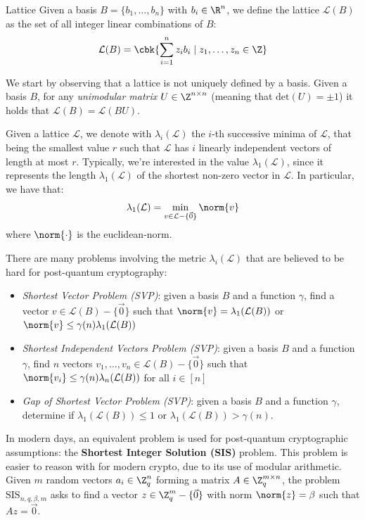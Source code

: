 \documentclass[a4paper, 12pt]{report}
\begin{document}
    \begin{frameddefn}{Lattice}
        Given a basis $B = \{b_1, \ldots, b_n\}$ with $b_i \in \R^n$, we define the lattice $\mathcal{L}(B)$ as the set of all integer linear combinations of $B$:
        \[\mathcal{L}(B) = \cbk{\sum_{i = 1}^{n} z_i b_i \mid z_1, \ldots, z_n \in \Z}\]
    \end{frameddefn}

    We start by observing that a lattice is not uniquely defined by a basis. Given a basis $B$, for any \textit{unimodular matrix} $U \in \Z^{n \times n}$ (meaning that $\mathrm{det}(U) = \pm 1$) it holds that $\mathcal{L}(B) = \mathcal{L}(BU)$.
    
    Given a lattice $\mathcal{L}$, we denote with $\lambda_i(\mathcal{L})$ the $i$-th successive minima of $\mathcal{L}$, that being the smallest value $r$ such that $\mathcal{L}$ has $i$ linearly independent vectors of length at most $r$. Typically, we're interested in the value $\lambda_1(\mathcal{L})$,  since it represents the length $\lambda_1(\mathcal{L})$ of the shortest non-zero vector in $\mathcal{L}$. In particular, we have that:
    \[\lambda_1(\mathcal{L}) = \min_{v \in \mathcal{L} - \{\vec 0\}} \norm{v}\]
    where $\norm{\cdot}$ is the euclidean-norm.

    There are many problems involving the metric $\lambda_i(\mathcal{L})$ that are believed to be hard for post-quantum cryptography:
    \begin{itemize}
        \item \textit{Shortest Vector Problem (SVP)}: given a basis $B$ and a function $\gamma$, find a vector $v \in \mathcal{L}(B)-\{\vec 0\}$ such that $\norm{v} = \lambda_1(\mathcal{L}(B))$ or $\norm{v} \leq \gamma(n) \lambda_1(\mathcal{L}(B))$
        \item \textit{Shortest Independent Vectors Problem (SVP)}: given a basis $B$ and a function $\gamma$, find $n$ vectors $v_1, \ldots, v_n \in \mathcal{L}(B)-\{\vec 0\}$ such that $\norm{v_i} \leq \gamma(n) \lambda_n(\mathcal{L}(B))$ for all $i \in [n]$
        \item \textit{Gap of Shortest Vector Problem (SVP)}: given a basis $B$ and a function $\gamma$, determine if $\lambda_1(\mathcal{L}(B)) \leq 1$ or $\lambda_1(\mathcal{L}(B)) > \gamma(n)$.
    \end{itemize}

    In modern days, an equivalent problem is used for post-quantum cryptographic assumptions: the \textbf{Shortest Integer Solution (SIS)} problem. This problem is easier to reason with for modern crypto, due to its use of modular arithmetic. Given $m$ random vectors $a_i \in \Z_q^n$ forming a matrix $A \in \Z_q^{m \times n}$, the problem $\mathrm{SIS}_{n,q,\beta,m}$ asks to find a vector $z \in \Z_q^m-\{\vec 0\}$ with norm $\norm{z} = \beta$ such that $Az = \vec 0$.
\end{document}
